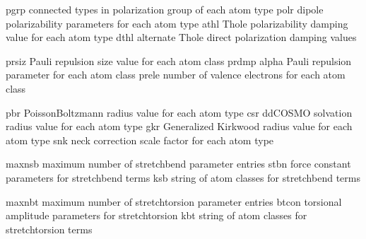 \documentclass[letterpaper,11pt,english]{sphinxmanual}
\begin{document}
\sphinxAtStartPar
{}

\begin{sphinxVerbatim}[commandchars=\\\{\}]
pgrp            connected types in polarization group of each atom type
polr            dipole polarizability parameters for each atom type
athl            Thole polarizability damping value for each atom type
dthl            alternate Thole direct polarization damping values
\end{sphinxVerbatim}

\sphinxAtStartPar
{}

\begin{sphinxVerbatim}[commandchars=\\\{\}]
prsiz           Pauli repulsion size value for each atom class
prdmp           alpha Pauli repulsion parameter for each atom class
prele           number of valence electrons for each atom class
\end{sphinxVerbatim}

\sphinxAtStartPar
{}

\begin{sphinxVerbatim}[commandchars=\\\{\}]
pbr             Poisson\PYGZhy{}Boltzmann radius value for each atom type
csr             ddCOSMO solvation radius value for each atom type
gkr             Generalized Kirkwood radius value for each atom type
snk             neck correction scale factor for each atom type
\end{sphinxVerbatim}

\sphinxAtStartPar
{}

\begin{sphinxVerbatim}[commandchars=\\\{\}]
maxnsb          maximum number of stretch\PYGZhy{}bend parameter entries
stbn            force constant parameters for stretch\PYGZhy{}bend terms
ksb             string of atom classes for stretch\PYGZhy{}bend terms
\end{sphinxVerbatim}

\sphinxAtStartPar
{}

\begin{sphinxVerbatim}[commandchars=\\\{\}]
maxnbt          maximum number of stretch\PYGZhy{}torsion parameter entries
btcon           torsional amplitude parameters for stretch\PYGZhy{}torsion
kbt             string of atom classes for stretch\PYGZhy{}torsion terms
\end{sphinxVerbatim}
\end{document}
